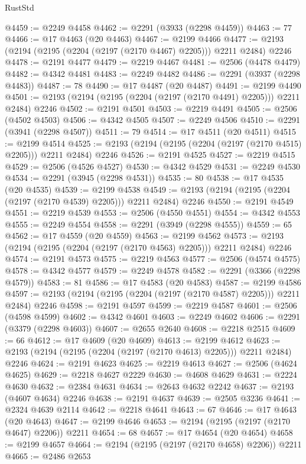 \begin{lexlean}{RustStd}
\begin{coremodule}
@4459 := @2249 @4458
@4462 := @2291 (@3933 (@2298 @4459))
@4463 := 77
@4466 := @17 @4463 (@20 @4463)
@4467 := @2199 @4466
@4477 := @2193 (@2194 (@2195 (@2204 (@2197 (@2170 @4467) @2205))) @2211 @2484) @2246
@4478 := @2191 @4477
@4479 := @2219 @4467
@4481 := @2506 (@4478 @4479)
@4482 := @4342 @4481
@4483 := @2249 @4482
@4486 := @2291 (@3937 (@2298 @4483))
@4487 := 78
@4490 := @17 @4487 (@20 @4487)
@4491 := @2199 @4490
@4501 := @2193 (@2194 (@2195 (@2204 (@2197 (@2170 @4491) @2205))) @2211 @2484) @2246
@4502 := @2191 @4501
@4503 := @2219 @4491
@4505 := @2506 (@4502 @4503)
@4506 := @4342 @4505
@4507 := @2249 @4506
@4510 := @2291 (@3941 (@2298 @4507))
@4511 := 79
@4514 := @17 @4511 (@20 @4511)
@4515 := @2199 @4514
@4525 := @2193 (@2194 (@2195 (@2204 (@2197 (@2170 @4515) @2205))) @2211 @2484) @2246
@4526 := @2191 @4525
@4527 := @2219 @4515
@4529 := @2506 (@4526 @4527)
@4530 := @4342 @4529
@4531 := @2249 @4530
@4534 := @2291 (@3945 (@2298 @4531))
@4535 := 80
@4538 := @17 @4535 (@20 @4535)
@4539 := @2199 @4538
@4549 := @2193 (@2194 (@2195 (@2204 (@2197 (@2170 @4539) @2205))) @2211 @2484) @2246
@4550 := @2191 @4549
@4551 := @2219 @4539
@4553 := @2506 (@4550 @4551)
@4554 := @4342 @4553
@4555 := @2249 @4554
@4558 := @2291 (@3949 (@2298 @4555))
@4559 := 65
@4562 := @17 @4559 (@20 @4559)
@4563 := @2199 @4562
@4573 := @2193 (@2194 (@2195 (@2204 (@2197 (@2170 @4563) @2205))) @2211 @2484) @2246
@4574 := @2191 @4573
@4575 := @2219 @4563
@4577 := @2506 (@4574 @4575)
@4578 := @4342 @4577
@4579 := @2249 @4578
@4582 := @2291 (@3366 (@2298 @4579))
@4583 := 81
@4586 := @17 @4583 (@20 @4583)
@4587 := @2199 @4586
@4597 := @2193 (@2194 (@2195 (@2204 (@2197 (@2170 @4587) @2205))) @2211 @2484) @2246
@4598 := @2191 @4597
@4599 := @2219 @4587
@4601 := @2506 (@4598 @4599)
@4602 := @4342 @4601
@4603 := @2249 @4602
@4606 := @2291 (@3379 (@2298 @4603))
@4607 := @2655 @2640
@4608 := @2218 @2515
@4609 := 66
@4612 := @17 @4609 (@20 @4609)
@4613 := @2199 @4612
@4623 := @2193 (@2194 (@2195 (@2204 (@2197 (@2170 @4613) @2205))) @2211 @2484) @2246
@4624 := @2191 @4623
@4625 := @2219 @4613
@4627 := @2506 (@4624 @4625)
@4629 := @2218 @4627 @2229
@4630 := @4608 @4629
@4631 := @2224 @4630
@4632 := @2384 @4631
@4634 := @2643 @4632 @2242
@4637 := @2193 (@4607 @4634) @2246
@4638 := @2191 @4637
@4639 := @2505 @3236
@4641 := @2324 @4639 @2114
@4642 := @2218 @4641
@4643 := 67
@4646 := @17 @4643 (@20 @4643)
@4647 := @2199 @4646
@4653 := @2194 (@2195 (@2197 (@2170 @4647) @2206)) @2211
@4654 := 68
@4657 := @17 @4654 (@20 @4654)
@4658 := @2199 @4657
@4664 := @2194 (@2195 (@2197 (@2170 @4658) @2206)) @2211
@4665 := @2486 @2653

\end{coremodule}
\end{lexlean}
